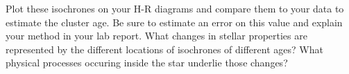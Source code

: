 Plot these isochrones on your H-R diagrams and compare them to your data to estimate the cluster age. Be sure to estimate an error on this value and explain your method in your lab report. What changes in stellar properties are represented by the different locations of isochrones of different ages? What physical processes occuring inside the star underlie those changes?


